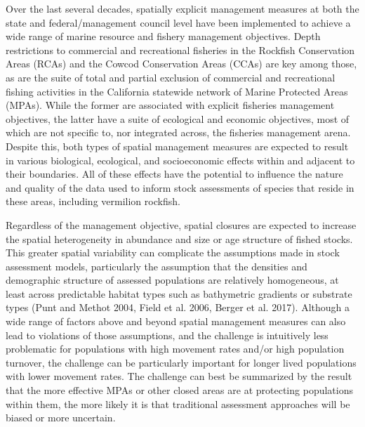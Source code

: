 \documentclass[11pt,
  english,
  a4paper,
]{article}
\begin{document}
Over the last several decades, spatially explicit management measures at both the state and federal/management council level have been implemented to achieve a wide range of marine resource and fishery management objectives. Depth restrictions to commercial and recreational fisheries in the Rockfish Conservation Areas (RCAs) and the Cowcod Conservation Areas (CCAs) are key among those, as are the suite of total and partial exclusion of commercial and recreational fishing activities in the California statewide network of Marine Protected Areas (MPAs). While the former are associated with explicit fisheries management objectives, the latter have a suite of ecological and economic objectives, most of which are not specific to, nor integrated across, the fisheries management arena. Despite this, both types of spatial management measures are expected to result in various biological, ecological, and socioeconomic effects within and adjacent to their boundaries. All of these effects have the potential to influence the nature and quality of the data used to inform stock assessments of species that reside in these areas, including vermilion rockfish.

Regardless of the management objective, spatial closures are expected to increase the spatial heterogeneity in abundance and size or age structure of fished stocks. This greater spatial variability can complicate the assumptions made in stock assessment models, particularly the assumption that the densities and demographic structure of assessed populations are relatively homogeneous, at least across predictable habitat types such as bathymetric gradients or substrate types {(Punt and Methot 2004, Field et al. 2006, Berger et al. 2017)\leavevmode\tagmcend\tagstructend}. Although a wide range of factors above and beyond spatial management measures can also lead to violations of those assumptions, and the challenge is intuitively less problematic for populations with high movement rates and/or high population turnover, the challenge can be particularly important for longer lived populations with lower movement rates. The challenge can best be summarized by the result that the more effective MPAs or other closed areas are at protecting populations within them, the more likely it is that traditional assessment approaches will be biased or more uncertain.
\end{document}
